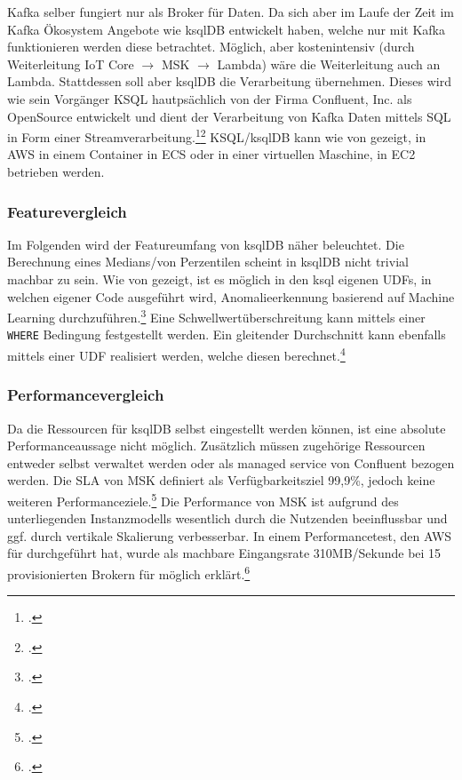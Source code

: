 Kafka selber fungiert nur als Broker für Daten. Da sich aber im Laufe der Zeit im Kafka Ökosystem Angebote wie ksqlDB entwickelt haben, welche nur mit Kafka funktionieren werden diese betrachtet. Möglich, aber kostenintensiv (durch Weiterleitung \ac{IoT} Core  $\rightarrow$ MSK  $\rightarrow$ Lambda) wäre die Weiterleitung auch an Lambda. Stattdessen soll aber ksqlDB die Verarbeitung übernehmen. Dieses wird wie sein Vorgänger KSQL hautpsächlich von der Firma Confluent, Inc. als OpenSource entwickelt und dient der Verarbeitung von Kafka Daten mittels \ac{SQL} in Form einer Streamverarbeitung.\footcite[Vgl.][]{Kreps.2019}\nzitat\footcite[Vgl.][]{Narkhede.2017} KSQL/ksqlDB kann wie von \citeauthor{Penz.2020} gezeigt, in \ac{AWS} in einem Container in \ac{ECS} oder in einer virtuellen Maschine, in \ac{EC2} betrieben werden.


\subsubsection{Featurevergleich}
Im Folgenden wird der Featureumfang von ksqlDB näher beleuchtet.
Die Berechnung eines Medians/von Perzentilen scheint in ksqlDB nicht trivial machbar zu sein.
Wie von \citeauthor{Waehner.2018} gezeigt, ist es möglich in den ksql eigenen \acp{UDF}, in welchen eigener Code ausgeführt wird, Anomalieerkennung basierend auf Machine Learning durchzuführen.\footcite[Vgl.][]{Waehner.2018}
Eine Schwellwertüberschreitung kann mittels einer \texttt{WHERE} Bedingung festgestellt werden.
Ein gleitender Durchschnitt kann ebenfalls mittels einer \ac{UDF} realisiert werden, welche diesen berechnet.\footcite[Vgl.][]{ConfluentInc..o.J.c}

\subsubsection{Performancevergleich}
Da die Ressourcen für ksqlDB selbst eingestellt werden können, ist eine absolute Performanceaussage nicht möglich. Zusätzlich müssen zugehörige Ressourcen entweder selbst verwaltet werden oder als managed service von Confluent bezogen werden.
Die \ac{SLA} von \ac{MSK} definiert als Verfügbarkeitsziel 99,9\%, jedoch keine weiteren Performanceziele.\footcite[Vgl.][]{AmazonWebServicesInc..2019e} 
Die Performance von \ac{MSK} ist aufgrund des unterliegenden Instanzmodells wesentlich durch die Nutzenden beeinflussbar und ggf. durch vertikale Skalierung verbesserbar.
In einem Performancetest, den \ac{AWS} für \citeauthor{Statz.2019} durchgeführt hat, wurde als machbare Eingangsrate 310MB/Sekunde bei 15 provisionierten Brokern für möglich erklärt.\footcite[Vgl.][]{Statz.2019} 

